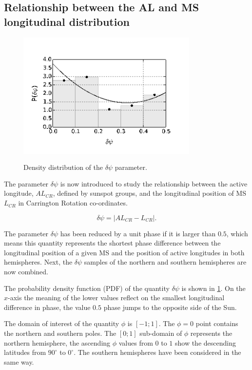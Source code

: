 \subsection{Relationship between the AL and MS longitudinal distribution}

\begin{figure}
	\centering
	{\includegraphics[width=90mm]{Chapter4/Figs/stat}}
	{\caption{Density distribution of the $\delta\psi$ parameter. }\label{stat}}
\end{figure}	

The parameter $\delta\psi$ is now introduced to study the relationship between the active longitude, $AL_{CR}$, defined by sunspot groups, and the longitudinal position of MS $L_{CR}$ in Carrington Rotation co-ordinates. 

\begin{equation}
\delta\psi = \left| AL_{CR} - L_{CR}\right|.
\end{equation}

The parameter $\delta\psi$ has been reduced by a unit phase if it is larger than $0.5$, which means this quantity represents the shortest phase difference between the longitudinal position of a given MS and the position of active longitudes in both hemispheres. 
Next, the $\delta\psi$ samples of the northern and southern hemispheres are now combined. 

The probability density function (PDF) of the quantity $\delta\psi$ is shown in \cref{stat}. On the $x$-axis the meaning of the lower values reflect on the smallest longitudinal difference in phase, the value $0.5$ phase jumps to the opposite side of the Sun.

The domain of interest of the quantity $\phi$ is $[-1;1]$. 
The $\phi=0$ point contains the northern and southern poles.
The $[0;1]$ sub-domain of $\phi$ represents the northern hemisphere, the ascending $\phi$ values from $0$ to $1$ show the descending latitudes from $90^{\circ}$ to $0^{\circ}$. 
The southern hemispheres have been considered in the same way.

